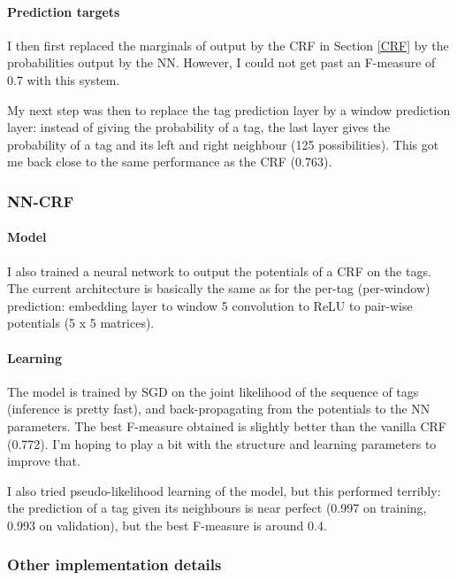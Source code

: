 \documentclass[10pt,a4paper]{article}
\begin{document}
  \paragraph{Prediction targets}

  I then first replaced the marginals of output by the CRF in Section \ref{CRF} by the probabilities output by the NN. However, I could not get past an F-measure of 0.7 with this system.
  
  My next step was then to replace the tag prediction layer by a window prediction layer: instead of giving the probability of a tag, the last layer gives the probability of a tag and its left and right neighbour (125 possibilities). This got me back close to the same performance as the CRF (0.763).

\subsubsection{NN-CRF}

  \paragraph{Model}

  I also trained a neural network to output the potentials of a CRF on the tags. The current architecture is basically the same as for the per-tag (per-window) prediction: embedding layer to window 5 convolution to ReLU to pair-wise potentials (5 x 5 matrices).

  \paragraph{Learning} The model is trained by SGD on the joint likelihood of the sequence of tags (inference is pretty fast), and back-propagating from the potentials to the NN parameters. The best F-measure obtained is slightly better than the vanilla CRF (0.772). I'm hoping to play a bit with the structure and learning parameters to improve that.
  
  I also tried pseudo-likelihood learning of the model, but this performed terribly: the prediction of a tag given its neighbours is near perfect (0.997 on training, 0.993 on validation), but the best F-measure is around 0.4.

\subsubsection{Other implementation details}
\end{document}
